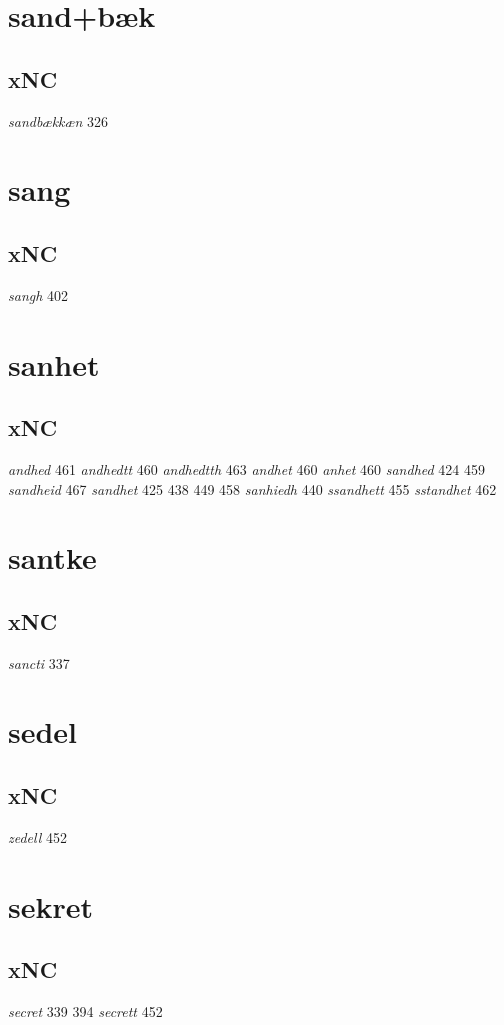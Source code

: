 \documentclass[a4paper,twocolumn]{article}
\begin{document}
\section{sand+bæk}
\label{sec:org491ae9e}
\subsection{xNC}
\label{sec:org464093f}
\emph{sandbækkæn} 326 
\section{sang}
\label{sec:org7600a84}
\subsection{xNC}
\label{sec:org97e0c5e}
\emph{sangh} 402 
\section{sanhet}
\label{sec:org91477d4}
\subsection{xNC}
\label{sec:orgaf93db0}
\emph{andhed} 461 \emph{andhedtt} 460 \emph{andhedtth} 463 \emph{andhet} 460 \emph{anhet} 460 \emph{sandhed} 424 459 \emph{sandheid} 467 \emph{sandhet} 425 438 449 458 \emph{sanhiedh} 440 \emph{ssandhett} 455 \emph{sstandhet} 462 
\section{santke}
\label{sec:orgc686fe2}
\subsection{xNC}
\label{sec:orga451546}
\emph{sancti} 337 
\section{sedel}
\label{sec:orge48e801}
\subsection{xNC}
\label{sec:org76d17e2}
\emph{zedell} 452 
\section{sekret}
\label{sec:orgd596e15}
\subsection{xNC}
\label{sec:org57b7fff}
\emph{secret} 339 394 \emph{secrett} 452 
\end{document}
